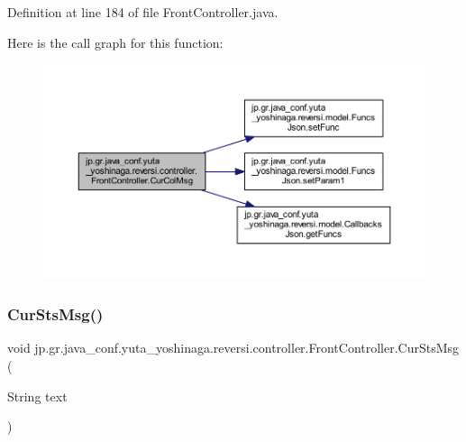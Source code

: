 Definition at line 184 of file Front\+Controller.\+java.

Here is the call graph for this function\+:
\nopagebreak
\begin{figure}[H]
\begin{center}
\leavevmode
\includegraphics[width=350pt]{classjp_1_1gr_1_1java__conf_1_1yuta__yoshinaga_1_1reversi_1_1controller_1_1_front_controller_ac49c44c8bb767770364c52164b699110_cgraph}
\end{center}
\end{figure}
\mbox{\label{classjp_1_1gr_1_1java__conf_1_1yuta__yoshinaga_1_1reversi_1_1controller_1_1_front_controller_a49315230e704778721afb73c59e14d88}} 
\subsubsection{\texorpdfstring{Cur\+Sts\+Msg()}{CurStsMsg()}}
{\footnotesize\ttfamily void jp.\+gr.\+java\+\_\+conf.\+yuta\+\_\+yoshinaga.\+reversi.\+controller.\+Front\+Controller.\+Cur\+Sts\+Msg (\begin{DoxyParamCaption}\item[{String}]{text }\end{DoxyParamCaption})}




